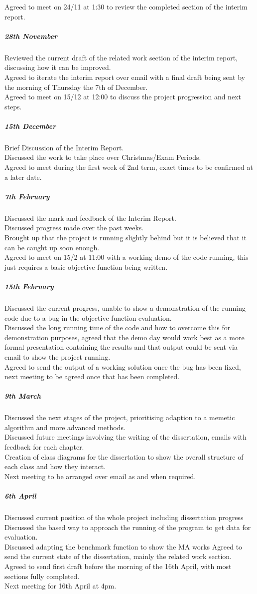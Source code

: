 \documentclass[a4paper]{article}
\begin{document}
Agreed to meet on 24/11 at 1:30 to review the completed section of the interim report.\\
\subparagraph{28th November}
Reviewed the current draft of the related work section of the interim report, discussing how it can be improved.\\
Agreed to iterate the interim report over email with a final draft being sent by the morning of Thursday the 7th of December.\\
Agreed to meet on 15/12 at 12:00 to discuss the project progression and next steps.\\
\subparagraph{15th December}
Brief Discussion of the Interim Report.\\
Discussed the work to take place over Christmas/Exam Periods.\\
Agreed to meet during the first week of 2nd term, exact times to be confirmed at a later date.\\
\subparagraph{7th February}
Discussed the mark and feedback of the Interim Report.\\
Discussed progress made over the past weeks.\\
Brought up that the project is running slightly behind but it is believed that it can be caught up soon enough.\\
Agreed to meet on 15/2 at 11:00 with a working demo of the code running, this just requires a basic objective function being written.
\subparagraph{15th February}
Discussed the current progress, unable to show a demonstration of the running code due to a bug in the objective function evaluation.\\
Discussed the long running time of the code and how to overcome this for demonstration purposes, agreed that the demo day would work best as a more formal presentation containing the results and that output could be sent via email to show the project running.\\
Agreed to send the output of a working solution once the bug has been fixed, next meeting to be agreed once that has been completed.
\subparagraph{9th March}
Discussed the next stages of the project, prioritising adaption to a memetic algorithm and more advanced methods.\\
Discussed future meetings involving the writing of the dissertation, emails with feedback for each chapter.\\
Creation of class diagrams for the dissertation to show the overall structure of each class and how they interact.\\
Next meeting to be arranged over email as and when required.
\subparagraph{6th April}
Discussed current position of the whole project including dissertation progress
Discussed the based way to approach the running of the program to get data for evaluation.\\
Discussed adapting the benchmark function to show the MA works
Agreed to send the current state of the dissertation, mainly the related work section.\\
Agreed to send first draft before the morning of the 16th April, with most sections fully completed.\\
Next meeting for 16th April at 4pm.
\end{document}
